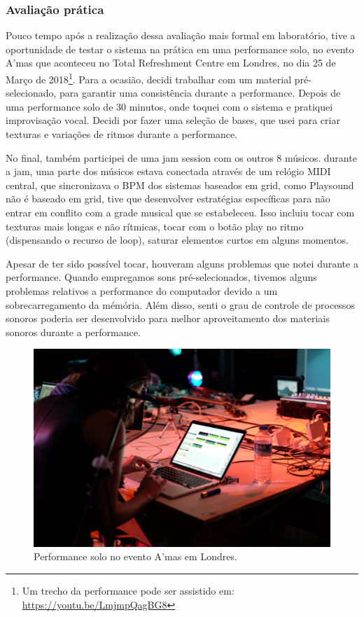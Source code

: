 \begin{description}
\subsubsection{Avaliação prática}

Pouco tempo após a realização dessa avaliação mais formal em laboratório, tive a oportunidade de testar o sistema na prática em uma performance solo, no evento A'mas que aconteceu no Total Refreshment Centre em Londres, no dia 25 de Março de 2018\footnote{Um trecho da performance pode ser assistido em: \url{https://youtu.be/LmjmpQagBG8}}. Para a ocasião, decidi trabalhar com um material pré-selecionado, para garantir uma consistência durante a performance. Depois de uma performance solo de 30 minutos, onde toquei com o sistema e pratiquei improvisação vocal. Decidi por fazer uma seleção de bases, que usei para criar texturas e variações de ritmos durante a performance. 

No final, também participei de uma jam session com os outros 8 músicos. durante a jam, uma parte dos músicos estava conectada através de um relógio MIDI central, que sincronizava o BPM dos sistemas baseados em grid, como Playsound não é baseado em grid, tive que desenvolver estratégias específicas para não entrar em conflito com a grade musical que se estabeleceu. Isso incluiu tocar com texturas mais longas e não rítmicas, tocar com o botão play no ritmo (dispensando o recurso de loop), saturar elementos curtos em alguns momentos.

Apesar de ter sido possível tocar, houveram alguns problemas que notei durante a performance. Quando empregamos sons pré-selecionados, tivemos alguns problemas relativos a performance do computador devido a um sobrecarregamento da mémória. Além disso, senti o grau de controle de processos sonoros poderia ser desenvolvido para melhor aproveitamento dos materiais sonoros durante a performance.

\begin{figure}

\includegraphics[width=1\textwidth]{pictures/cap4/ariane_amas}
\caption{\label{amas}Performance solo no evento A'mas em Londres.}
\label{fig:amas}
\end{figure}


\end{description}





